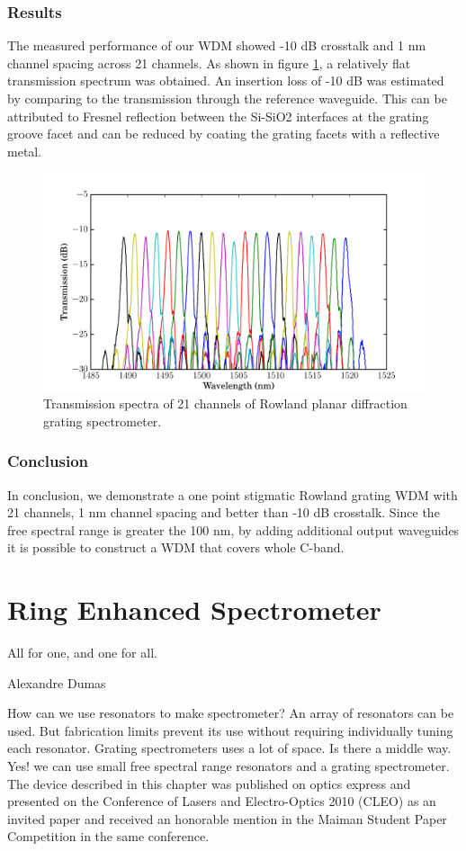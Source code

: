 \documentclass[12pt,twoside,english]{book}
\renewcommand{\~}{\perispomeni}%
\numberwithin{equation}{section}
\numberwithin{figure}{section}
\begin{document}
\subsection{Results}
The measured performance of our \gls{WDM} showed -10 dB crosstalk and 1 nm channel spacing across 21 channels. As shown in figure \ref{fig:spectrum 1}, a relatively flat transmission spectrum was obtained. An insertion loss of -10 dB was estimated by comparing to the transmission through the reference waveguide. This can be attributed to Fresnel reflection between the Si-SiO2 interfaces at the grating groove facet and can be reduced by coating the grating facets with a reflective metal.
\begin{figure}[h]
\includegraphics{graphs/gen5}
\caption{Transmission spectra of 21 channels of Rowland planar diffraction grating spectrometer.}
\label{fig:spectrum 1}
\end{figure}

\subsection{Conclusion}
In conclusion, we demonstrate a one point stigmatic Rowland grating \gls{WDM} with 21 channels, 1 nm channel spacing and better than -10 dB crosstalk. Since the free spectral range is greater the 100 nm, by adding additional output waveguides it is possible to construct a \gls{WDM} that covers whole C-band.%

\chapter{Ring Enhanced Spectrometer}
\epigraph{All for one, and one for all.}
{Alexandre Dumas}
How can we use resonators to make spectrometer? An array of resonators can be used. But fabrication limits prevent its use without requiring individually tuning each resonator. Grating spectrometers uses a lot of space. Is there a middle way. Yes! we can use small free spectral range resonators and a grating spectrometer. The device described in this chapter was published on optics express and presented on the Conference of Lasers and Electro-Optics 2010 (CLEO) as an invited paper and received an honorable mention in the Maiman Student Paper Competition in the same conference.
\end{document}
